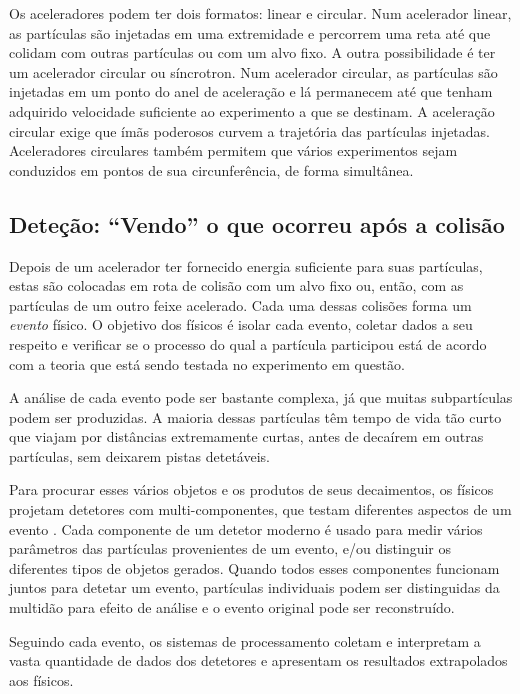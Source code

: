 Os aceleradores podem ter dois formatos: linear e
circular. Num acelerador linear, as partículas são
injetadas em uma extremidade e percorrem uma reta até que colidam com outras
partículas ou com um alvo fixo. A outra possibilidade é ter um acelerador
circular ou
síncrotron. Num acelerador circular, as partículas são injetadas em um ponto
do anel de aceleração e lá permanecem até que tenham adquirido velocidade
suficiente ao experimento a que se destinam. A aceleração circular exige que
ímãs poderosos curvem a trajetória das partículas injetadas. Aceleradores
circulares também permitem que vários experimentos sejam conduzidos em pontos
de sua circunferência, de forma simultânea.

\subsection{Deteção: ``Vendo'' o que ocorreu a\-pós a coli\-são}

Depois de um acelerador ter fornecido energia suficiente para suas
par\-tí\-culas, estas são colocadas em rota de colisão com um alvo fixo ou,
então, com as partículas de um outro feixe acelerado. Cada uma dessas colisões
forma um \emph{evento} físico. O objetivo dos físicos é isolar cada evento,
coletar dados a seu respeito e verificar se o processo do qual a partícula
participou está de acordo com a teoria que está sendo testada no experimento
em questão.

A análise de cada evento pode ser bastante complexa, já que muitas
subpar\-tí\-cu\-las podem ser produzidas. A maioria dessas partículas têm
tempo de vida tão curto que viajam por distâncias extremamente curtas, antes
de decaírem em outras partículas, sem deixarem pistas detetáveis.

Para procurar esses vários objetos e os produtos de seus decaimentos, os
físicos projetam detetores com multi-componentes, que testam diferentes
aspectos de um evento \cite{d0, cms, atlas-tp, booth}. Cada componente de um
detetor moderno é usado para medir vários parâmetros das partículas
provenientes de um evento, e/ou distinguir os diferentes tipos de objetos
gerados.  Quando todos esses componentes funcionam juntos para detetar um
evento, partículas individuais podem ser distinguidas da multidão para efeito
de análise e o evento original pode ser reconstruído.

Seguindo cada evento, os sistemas de processamento coletam e interpretam a
vasta quantidade de dados dos detetores e apresentam os resultados extrapolados
aos físicos.

